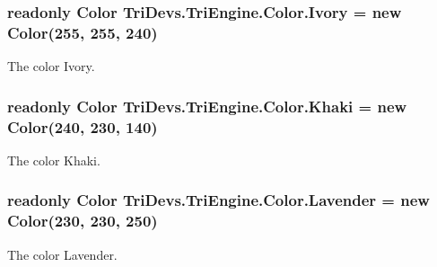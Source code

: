 \hypertarget{struct_tri_devs_1_1_tri_engine_1_1_color_ab7cdf8e73d567c3d8224810300250c02}{
\subsubsection[{Ivory}]{\setlength{\rightskip}{0pt plus 5cm}readonly {\bf Color} Tri\-Devs.\-Tri\-Engine.\-Color.\-Ivory = new {\bf Color}(255, 255, 240)\hspace{0.3cm}{\ttfamily [static]}}}\label{struct_tri_devs_1_1_tri_engine_1_1_color_ab7cdf8e73d567c3d8224810300250c02}


The color Ivory. 

\hypertarget{struct_tri_devs_1_1_tri_engine_1_1_color_ad44242004fcbc5effbded130d0fb9247}{
\subsubsection[{Khaki}]{\setlength{\rightskip}{0pt plus 5cm}readonly {\bf Color} Tri\-Devs.\-Tri\-Engine.\-Color.\-Khaki = new {\bf Color}(240, 230, 140)\hspace{0.3cm}{\ttfamily [static]}}}\label{struct_tri_devs_1_1_tri_engine_1_1_color_ad44242004fcbc5effbded130d0fb9247}


The color Khaki. 

\hypertarget{struct_tri_devs_1_1_tri_engine_1_1_color_a8afe354a85ec0fd3e5a5dfe29c4df610}{
\subsubsection[{Lavender}]{\setlength{\rightskip}{0pt plus 5cm}readonly {\bf Color} Tri\-Devs.\-Tri\-Engine.\-Color.\-Lavender = new {\bf Color}(230, 230, 250)\hspace{0.3cm}{\ttfamily [static]}}}\label{struct_tri_devs_1_1_tri_engine_1_1_color_a8afe354a85ec0fd3e5a5dfe29c4df610}


The color Lavender. 

